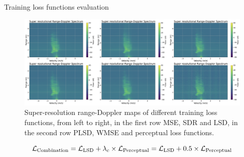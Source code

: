 \documentclass{beamer}
\begin{document}
\begin{frame}{Training loss functions evaluation}

    \begin{figure}
        \centering
        \vspace{-0.5\baselineskip}
        \includegraphics[scale=.33]{MA_presentation/figures/evaluation_loss_functions.png}
        \caption{Super-resolution range-Doppler maps of different training loss functions, from left to right, in the first row MSE, SDR and LSD, in the second row PLSD, WMSE and perceptual loss functions.}
    \end{figure}

    \vspace{-1.8\baselineskip}
    
    \begin{equation}
        \centering
        \mathcal{L}_{\text{Combination}} = \mathcal{L}_{\text{LSD}} + \lambda_c \times \mathcal{L}_{\text{Perceptual}} = \mathcal{L}_{\text{LSD}} + 0.5 \times \mathcal{L}_{\text{Perceptual}}
        \label{loss combination}
    \end{equation}
    
\end{frame}
\end{document}
